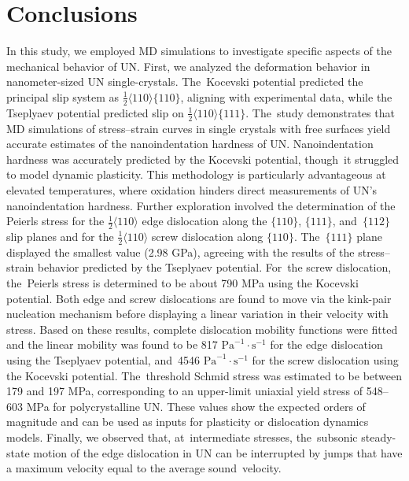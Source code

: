 \documentclass[applsci,article,accept,pdftex,moreauthors]{Definitions/mdpi}
\newcommand{\?}{\stackrel{?}{=}}
\begin{document}
\section{Conclusions}

In this study, we employed MD simulations to investigate specific aspects of the mechanical behavior of UN. First, we analyzed the deformation behavior in nanometer-sized UN single-crystals. The~Kocevski potential predicted the principal slip system as $\frac{1}{2} \langle 110 \rangle \{110\}$, aligning with experimental data, while the Tseplyaev potential predicted slip on $\frac{1}{2} \langle 110 \rangle \{111\}$. The~study demonstrates that MD simulations of stress--strain curves in single crystals with free surfaces yield accurate estimates of the nanoindentation hardness of UN. Nanoindentation hardness was accurately predicted by the Kocevski potential, though~it struggled to model dynamic plasticity. This methodology is particularly advantageous at elevated temperatures, where oxidation hinders direct measurements of UN's nanoindentation hardness. Further exploration involved the determination of the Peierls stress for the $\frac{1}{2} \langle 110 \rangle$ edge dislocation along the $\{ 110 \}$, $\{ 111 \}$, and~$\{ 112 \}$ slip planes and for the $\frac{1}{2} \langle 110 \rangle$ screw dislocation along $\{110\}$. The~$\{ 111 \}$ plane displayed the smallest value (2.98 GPa), agreeing with the results of the stress--strain behavior predicted by the Tseplyaev potential. For~the screw dislocation, the~Peierls stress is determined to be about 790 MPa using the Kocevski potential. Both edge and screw dislocations are found to move via the kink-pair nucleation mechanism before displaying a linear variation in their velocity with stress. Based on these results, complete dislocation mobility functions were fitted and the linear mobility was found to be 817 $\mathrm{Pa}^{-1} \! \cdot \! \mathrm{s}^{-1}$ for the edge dislocation using the Tseplyaev potential, and~4546 $\mathrm{Pa}^{-1} \! \cdot \! \mathrm{s}^{-1}$ for the screw dislocation using the Kocevski potential. The~threshold Schmid stress was estimated to be between 179 and 197 MPa, corresponding to an upper-limit uniaxial yield stress of 548--603 MPa for polycrystalline UN. These values show the expected orders of magnitude and can be used as inputs for plasticity or dislocation dynamics models. Finally, we observed that, at~intermediate stresses, the~subsonic steady-state motion of the edge dislocation in UN can be interrupted by jumps that have a maximum velocity equal to the average sound~velocity.
\end{document}
